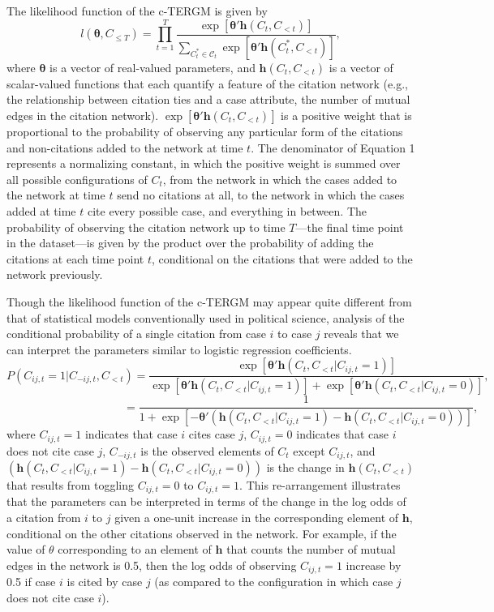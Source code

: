 \documentclass[headsepline=true, abstracton]{scrartcl}
\begin{document}
The likelihood function of the c-TERGM is given by
\begin{equation}
l(\bm{\theta},C_{\leq T}) =  \prod_{t=1}^T \frac{ \exp \left[ {\bm{\theta}'\bm{h}(C_{t},C_{<t}) } \right] }{ \sum_{C_t^* \in \mathcal{C}_t} \exp \left[ {\bm{\theta}'\bm{h}(C^*_{t},C_{<t}) }\right]  },
\end{equation}
where $\bm{\theta}$ is a vector of real-valued parameters, and $\bm{h}(C_{t},C_{<t})$ is a vector of scalar-valued functions that each quantify a feature of the citation network (e.g., the relationship between citation ties and a case attribute, the number of mutual edges in the citation network). $\exp \left[ {\bm{\theta}'\bm{h}(C_{t},C_{<t}) } \right]$ is a positive weight that is proportional to the probability of observing any particular form of the citations and non-citations added to the network at time $t$.  The denominator of Equation 1 represents a normalizing constant, in which the positive weight is summed over all possible configurations of $C_{t}$, from the network in which the cases added to the network at time $t$ send no citations at all, to the network in which the cases added at time $t$ cite every possible case, and everything in between. The probability of observing the citation network up to time $T$---the final time point in the dataset---is given by the product over the probability of adding the citations at each time point $t$, conditional on the citations that were added to the network previously. 

Though the likelihood function of the c-TERGM may appear quite different from that of statistical models conventionally used in political science, analysis of the conditional probability of a single citation from case $i$ to case $j$ reveals that we can interpret the parameters similar to logistic regression coefficients. $$ P(C_{ij,t} = 1 | C_{-ij,t}, C_{ < t}) = \frac{\exp \left[ {\bm{\theta}'\bm{h}(C_{t},C_{<t}| C_{ij,t} = 1) } \right]}{ \exp \left[ {\bm{\theta}'\bm{h}(C_{t},C_{<t}| C_{ij,t} = 1) } \right] + \exp \left[ {\bm{\theta}'\bm{h}(C_{t},C_{<t}| C_{ij,t} = 0) } \right]}, $$ $$ \text{~~~~~~~~~~~~~~~~~~~~~~~~~~~~~~~} = \frac{1}{ 1 + \exp \left[ - {\bm{\theta}'\left(\bm{h}(C_{t},C_{<t}| C_{ij,t} = 1) - \bm{h}(C_{t},C_{<t}| C_{ij,t} = 0)\right)} \right]}, $$
where $C_{ij,t} = 1$ indicates that case $i$ cites case $j$, $C_{ij,t} = 0$ indicates that case $i$ does not cite case $j$, $C_{-ij,t}$ is the observed elements of $C_{t}$ except $C_{ij,t}$, and $\left(\bm{h}(C_{t},C_{<t}| C_{ij,t} = 1) - \bm{h}(C_{t},C_{<t}| C_{ij,t} = 0)\right)$ is the change in $\bm{h}(C_{t},C_{<t})$ that results from toggling $C_{ij,t} = 0$ to $C_{ij,t} = 1$. This re-arrangement illustrates that the parameters can be interpreted in terms of the change in the log odds of a citation from $i$ to $j$ given a one-unit increase in the corresponding element of $\bm{h}$, conditional on the other citations observed in the network. For example, if the value of $\theta$ corresponding to an element of $\bm{h}$ that counts the number of mutual edges in the network is 0.5, then the log odds of observing $C_{ij,t} = 1$ increase by 0.5 if case $i$ is cited by case $j$ (as compared to the configuration in which case $j$ does not cite case $i$). 
\end{document}
